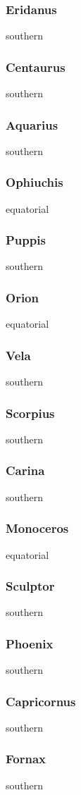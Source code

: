 \subsubsection{Eridanus}
southern
\subsubsection{Centaurus}
southern
\subsubsection{Aquarius}
southern
\subsubsection{Ophiuchis}
equatorial
\subsubsection{Puppis}
southern
\subsubsection{Orion}
equatorial
\subsubsection{Vela}
southern
\subsubsection{Scorpius}
southern
\subsubsection{Carina}
southern
\subsubsection{Monoceros}
equatorial
\subsubsection{Sculptor}
southern
\subsubsection{Phoenix}
southern
\subsubsection{Capricornus}
southern
\subsubsection{Fornax}
southern
